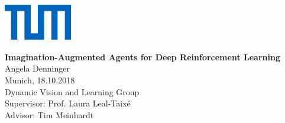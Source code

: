 \newcommand{\thema}{Imagination-Augmented Agents for Deep Reinforcement Learning}
\newcommand{\schlagworte}{}

\newcommand{\zusammenfassung}{bla

\vspace*{0.3cm}

blub
}


\newcommand{\autor}{Angela Denninger}
\newcommand{\autorStrasse}{Hindenburgstr. 13}
\newcommand{\autorPLZ}{78467 }
\newcommand{\autorOrt}{Garching bei München}

\newcommand{\autorGeburtsort}{Tübingen}
\newcommand{\autorGeburtsdatum}{17.06.1990}

\newcommand{\supervisor}{Prof. Laura Leal-Taixé}
\newcommand{\advisor}{Tim Meinhardt}


\newpage

\begin{titlepage}

\vspace*{-1.5cm}
\begin{flushleft}
\hspace*{-1cm} \includegraphics[width=3.0cm]{Images/Universitaet_Logo_RGB}
\end{flushleft}

\vspace{2.5cm}

\begin{center}
	\huge{\textbf{\thema}} \\[1.5cm]

	\LARGE{\autor} \\[0.5cm]
	
	\large{Munich, 18.10.2018}\\[2.3cm]	
	
	\Large{Dynamic Vision and Learning Group}\\[1.5cm]
	
	\large{Supervisor: \supervisor}\\
	\large{Advisor: \advisor}
\end{center}

\vspace*{3.5cm}



\end{titlepage}

